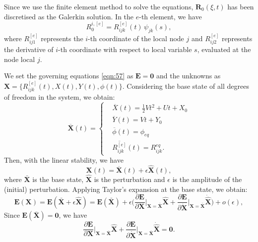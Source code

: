 \documentclass[a4paper,12pt]{report}
\begin{document}
Since we use the finite element method to solve the equations, $\mathbf{R}_0(\xi,t)$ has been discretised as the Galerkin solution. In the $e$-th element, we have
\begin{equation}
	\label{eqn:108}
R_0^{i,[e]}=R_{ijk}^{[e]}(t)\, \psi_{jk}(s),
\end{equation}
where $R_{ij1}^{[e]}$ represents the $i$-th coordinate of the local node $j$ and $R_{ij2}^{[e]}$ represents the derivative of $i$-th coordinate with respect to local variable $s$, evaluated at the node local $j$.

We set the governing equations \eqref{eqn:57} as $\mathbf{E}=\mathbf{0}$ and the unknowns as $\mathbf{X}=\{R_{ijk}^{[e]}(t),X(t), Y(t),\phi(t)\}$. Considering the base state of all degrees of freedom in the system, we obtain:
\begin{equation}
	\label{eqn:112}
	\overline{\mathbf{X}}(t)=\left\{\begin{aligned}
		&\overline{X}(t)=\frac{1}{2}Vt^2+Ut+X_{0} \\
		&\overline{Y}(t)=Vt+Y_{0} \\
		&\overline{\phi}(t)=\phi_{eq} \\
		&\overline{R_{ijk}^{[e]}}(t)=R_{ijk}^{eq}.
	\end{aligned}\right.	
\end{equation}
Then, with the linear stability, we have 
\begin{equation}
	\label{eqn:123}
    \mathbf{X}(t)=\overline{\mathbf{X}}(t)+\epsilon \hat{\mathbf{X}}(t),
\end{equation}
where $\bar{\mathbf{X}}$ is the base state, $\hat{\mathbf{X}}$ is the perturbation and $\epsilon$ is the amplitude of the (initial) perturbation.
Applying Taylor's expansion at the base state, we obtain:
\begin{equation}
	\label{eqn:109}
\mathbf{E}(\mathbf{X})=\mathbf{E}(\bar{\mathbf{X}}+\epsilon \hat{\mathbf{X}})=\mathbf{E}(\bar{\mathbf{X}})+\epsilon \Big(\frac{\partial \mathbf{E}}{\partial \mathbf{X}}\Big|_{\mathbf{X}=\bar{\mathbf{X}}}\hat{\mathbf{X}}+\frac{\partial \mathbf{E}}{\partial \dot{\mathbf{X}}}\Big|_{\mathbf{X}=\bar{\mathbf{X}}}\dot{\hat{\mathbf{X}}}\Big)+o(\epsilon),
\end{equation}
 Since $\mathbf{E}(\bar{\mathbf{X}})=\mathbf{0}$, we have 
\begin{equation}
	\label{eqn:110}
	\frac{\partial \mathbf{E}}{\partial \mathbf{X}}\Big|_{\mathbf{X}=\bar{\mathbf{X}}}\hat{\mathbf{X}}+\frac{\partial \mathbf{E}}{\partial \dot{\mathbf{X}}}\Big|_{\mathbf{X}=\bar{\mathbf{X}}}\dot{\hat{\mathbf{X}}}=\mathbf{0}.
\end{equation}
\end{document}
